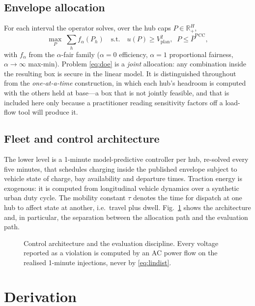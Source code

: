 \documentclass[lettersize,journal]{IEEEtran}
\begin{document}
\subsection{Envelope allocation}
For each interval the operator solves, over the hub caps
$P\in\mathbb{R}^{H}_{+}$,
\begin{equation}\label{eq:doe}
\max_{P}\;\textstyle\sum_h f_\alpha(P_h)
\quad\text{s.t.}\quad u(P)\ge V_{\mathrm{plan}}^{2},\;\; P\le \bar P^{\mathrm{PCC}},
\end{equation}
with $f_\alpha$ from the $\alpha$-fair family \cite{mo2000fair} ($\alpha=0$
efficiency, $\alpha=1$ proportional fairness, $\alpha\!\to\!\infty$ max-min).
Problem \eqref{eq:doe} is a \emph{joint} allocation: any combination inside the
resulting box is secure in the linear model. It is distinguished throughout
from the \emph{one-at-a-time} construction, in which each hub's headroom is
computed with the others held at base---a box that is not jointly feasible, and
that is included here only because a practitioner reading sensitivity factors
off a load-flow tool will produce it.

\subsection{Fleet and control architecture}
The lower level is a 1-minute model-predictive controller per hub, re-solved
every five minutes, that schedules charging inside the published envelope
subject to vehicle state of charge, bay availability and departure times.
Traction energy is exogenous: it is computed from longitudinal vehicle dynamics
over a synthetic urban duty cycle. The mobility constant $\tau$ denotes the
time for dispatch at one hub to affect state at another, i.e.\ travel plus
dwell. Fig.~\ref{fig:arch} shows the architecture and, in particular, the
separation between the allocation path and the evaluation path.

\begin{figure}[!t]\centering
\resizebox{0.98\columnwidth}{!}{}
\caption{Control architecture and the evaluation discipline. Every voltage
reported as a violation is computed by an AC power flow on the realised
1-minute injections, never by \eqref{eq:lindist}.}
\label{fig:arch}
\end{figure}

\section{Derivation}\label{sec:derivation}
\end{document}
